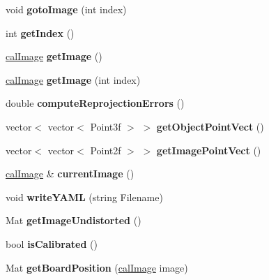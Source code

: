 \begin{DoxyCompactItemize}
\item 
void {\bfseries goto\+Image} (int index)\hypertarget{classcalibrator2d_a9fd8b766132a7ce73343865ec06fcc0c}{}\label{classcalibrator2d_a9fd8b766132a7ce73343865ec06fcc0c}

\item 
int {\bfseries get\+Index} ()\hypertarget{classcalibrator2d_a4fa946638fe84cb015904af249d383c8}{}\label{classcalibrator2d_a4fa946638fe84cb015904af249d383c8}

\item 
\hyperlink{classcalImage}{cal\+Image} {\bfseries get\+Image} ()\hypertarget{classcalibrator2d_aebf7e6f254b50edef6dadea24d7095ce}{}\label{classcalibrator2d_aebf7e6f254b50edef6dadea24d7095ce}

\item 
\hyperlink{classcalImage}{cal\+Image} {\bfseries get\+Image} (int index)\hypertarget{classcalibrator2d_a73eb66d400663b1693188c9798364773}{}\label{classcalibrator2d_a73eb66d400663b1693188c9798364773}

\item 
double {\bfseries compute\+Reprojection\+Errors} ()\hypertarget{classcalibrator2d_a7cc23e9a343e0acef95e6b83dda108fd}{}\label{classcalibrator2d_a7cc23e9a343e0acef95e6b83dda108fd}

\item 
vector$<$ vector$<$ Point3f $>$ $>$ {\bfseries get\+Object\+Point\+Vect} ()\hypertarget{classcalibrator2d_a4e1d16dcb976d268985032a42bf627ad}{}\label{classcalibrator2d_a4e1d16dcb976d268985032a42bf627ad}

\item 
vector$<$ vector$<$ Point2f $>$ $>$ {\bfseries get\+Image\+Point\+Vect} ()\hypertarget{classcalibrator2d_a3861a75680988cb9bb098832faba0133}{}\label{classcalibrator2d_a3861a75680988cb9bb098832faba0133}

\item 
\hyperlink{classcalImage}{cal\+Image} \& {\bfseries current\+Image} ()\hypertarget{classcalibrator2d_a5e693cda283906f1077e89117c11a34c}{}\label{classcalibrator2d_a5e693cda283906f1077e89117c11a34c}

\item 
void {\bfseries write\+Y\+A\+ML} (string Filename)\hypertarget{classcalibrator2d_ace320844475a379524b8dd18ff037036}{}\label{classcalibrator2d_ace320844475a379524b8dd18ff037036}

\item 
Mat {\bfseries get\+Image\+Undistorted} ()\hypertarget{classcalibrator2d_a679d99c79f8a8d499a896c60e1734f20}{}\label{classcalibrator2d_a679d99c79f8a8d499a896c60e1734f20}

\item 
bool {\bfseries is\+Calibrated} ()\hypertarget{classcalibrator2d_a3e84790c9d4fcd23202f02b3d6917f5d}{}\label{classcalibrator2d_a3e84790c9d4fcd23202f02b3d6917f5d}

\item 
Mat {\bfseries get\+Board\+Position} (\hyperlink{classcalImage}{cal\+Image} image)\hypertarget{classcalibrator2d_addc5eb020d5b77d46dcc9cc3a6e619cf}{}\label{classcalibrator2d_addc5eb020d5b77d46dcc9cc3a6e619cf}

\end{DoxyCompactItemize}
